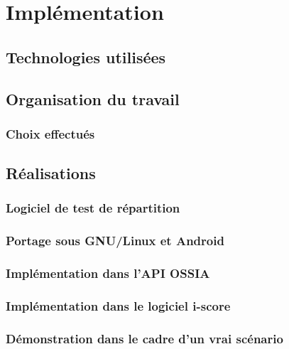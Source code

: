 \chapter{Implémentation}
\section{Technologies utilisées}

\section{Organisation du travail}
\subsection{Choix effectués}
\section{Réalisations}
\subsection{Logiciel de test de répartition}
\subsection{Portage sous GNU/Linux et Android}
\subsection{Implémentation dans l'API OSSIA} 
\subsection{Implémentation dans le logiciel i-score}
\subsection{Démonstration dans le cadre d'un vrai scénario}

